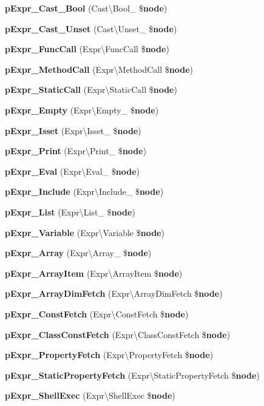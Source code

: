 \begin{DoxyCompactItemize}
\item 
{\bf p\+Expr\+\_\+\+Cast\+\_\+\+Bool} (Cast\textbackslash{}\+Bool\+\_\+ \${\bf node})
\item 
{\bf p\+Expr\+\_\+\+Cast\+\_\+\+Unset} (Cast\textbackslash{}\+Unset\+\_\+ \${\bf node})
\item 
{\bf p\+Expr\+\_\+\+Func\+Call} (Expr\textbackslash{}\+Func\+Call \${\bf node})
\item 
{\bf p\+Expr\+\_\+\+Method\+Call} (Expr\textbackslash{}\+Method\+Call \${\bf node})
\item 
{\bf p\+Expr\+\_\+\+Static\+Call} (Expr\textbackslash{}\+Static\+Call \${\bf node})
\item 
{\bf p\+Expr\+\_\+\+Empty} (Expr\textbackslash{}\+Empty\+\_\+ \${\bf node})
\item 
{\bf p\+Expr\+\_\+\+Isset} (Expr\textbackslash{}\+Isset\+\_\+ \${\bf node})
\item 
{\bf p\+Expr\+\_\+\+Print} (Expr\textbackslash{}\+Print\+\_\+ \${\bf node})
\item 
{\bf p\+Expr\+\_\+\+Eval} (Expr\textbackslash{}\+Eval\+\_\+ \${\bf node})
\item 
{\bf p\+Expr\+\_\+\+Include} (Expr\textbackslash{}\+Include\+\_\+ \${\bf node})
\item 
{\bf p\+Expr\+\_\+\+List} (Expr\textbackslash{}\+List\+\_\+ \${\bf node})
\item 
{\bf p\+Expr\+\_\+\+Variable} (Expr\textbackslash{}\+Variable \${\bf node})
\item 
{\bf p\+Expr\+\_\+\+Array} (Expr\textbackslash{}\+Array\+\_\+ \${\bf node})
\item 
{\bf p\+Expr\+\_\+\+Array\+Item} (Expr\textbackslash{}\+Array\+Item \${\bf node})
\item 
{\bf p\+Expr\+\_\+\+Array\+Dim\+Fetch} (Expr\textbackslash{}\+Array\+Dim\+Fetch \${\bf node})
\item 
{\bf p\+Expr\+\_\+\+Const\+Fetch} (Expr\textbackslash{}\+Const\+Fetch \${\bf node})
\item 
{\bf p\+Expr\+\_\+\+Class\+Const\+Fetch} (Expr\textbackslash{}\+Class\+Const\+Fetch \${\bf node})
\item 
{\bf p\+Expr\+\_\+\+Property\+Fetch} (Expr\textbackslash{}\+Property\+Fetch \${\bf node})
\item 
{\bf p\+Expr\+\_\+\+Static\+Property\+Fetch} (Expr\textbackslash{}\+Static\+Property\+Fetch \${\bf node})
\item 
{\bf p\+Expr\+\_\+\+Shell\+Exec} (Expr\textbackslash{}\+Shell\+Exec \${\bf node})

\end{DoxyCompactItemize}
